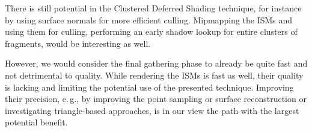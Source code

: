 There is still potential in the Clustered Deferred Shading technique, for instance by using surface normals for more efficient culling. Mipmapping the ISMs and using them for culling, performing an early shadow lookup for entire clusters of fragments, would be interesting as well.

However, we would consider the final gathering phase to already be quite fast and not detrimental to quality. While rendering the ISMs is fast as well, their quality is lacking and limiting the potential use of the presented technique. Improving their precision, e.\,g., by improving the point sampling or surface reconstruction or investigating triangle-based approaches, is in our view the path with the largest potential benefit.
